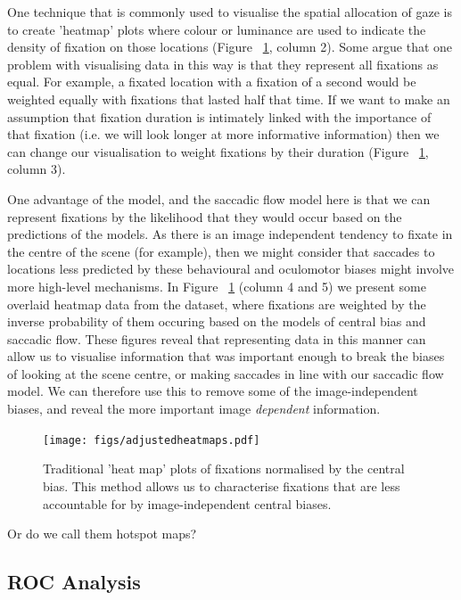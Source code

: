 \documentclass[a4paper, onecolumn, oneside, 11pt]{article}
\begin{document}
One technique that is commonly used to visualise the spatial allocation of gaze is to create 'heatmap' plots where colour or luminance are used to indicate the density of fixation on those locations (Figure ~\ref{fig:adjustedHeatmaps}, column 2). Some argue that one problem with visualising data in this way is that they represent all fixations as equal. For example, a fixated location with a fixation of a second would be weighted equally with fixations that lasted half that time. If we want to make an assumption that fixation duration is intimately linked with the importance of that fixation (i.e. we will look longer at more informative information) then we can change our visualisation to weight fixations by their duration (Figure ~\ref{fig:adjustedHeatmaps}, column 3).

One advantage of the \citep{clarke-tatler2014} model, and the saccadic flow model here is that we can represent fixations by the likelihood that they would occur based on the predictions of the models. As there is an image independent tendency to fixate in the centre of the scene (for example), then we might consider that saccades to locations less predicted by these behavioural and oculomotor biases might involve more high-level mechanisms. In Figure ~\ref{fig:adjustedHeatmaps} (column 4 and 5) we present some overlaid heatmap data from the \citep{clarke2013} dataset, where fixations are weighted by the inverse probability of them occuring based on the models of central bias and saccadic flow. These figures reveal that representing data in this manner can allow us to visualise information that was important enough to break the biases of looking at the scene centre, or making saccades in line with our saccadic flow model. We can therefore use this to remove some of the image-independent biases, and reveal the more important image \emph{dependent} information.

\begin{figure}
\texttt{[image: figs/adjustedheatmaps.pdf]}
\caption{Traditional 'heat map' plots of fixations normalised by the central bias. This method allows us to characterise fixations that are less accountable for by image-independent central biases.}
\label{fig:adjustedHeatmaps}
\end{figure}

Or do we call them hotspot maps?

\subsection{ROC Analysis}
\end{document}
